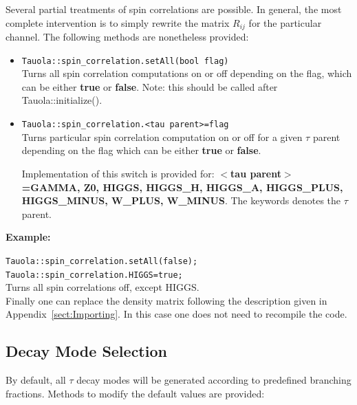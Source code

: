 \documentclass[]{Tauola_interface_design}
\begin{document}
Several partial treatments of spin correlations
are possible. In general, the most complete   intervention is to simply rewrite the matrix $R_{ij}$ 
for the particular channel. The following methods are nonetheless provided:

\begin{itemize}
 \item {\tt Tauola::spin\_correlation.setAll(bool flag)} \hfill \\
Turns all spin correlation computations on or off depending on the flag, which can be either \textbf{true} or \textbf{false}.
Note: this should be called after Tauola::initialize().
 \item {\tt Tauola::spin\_correlation.<tau parent>=flag} \hfill \\
Turns particular spin correlation computation on or off for a given $\tau$ parent depending on the flag which can be either
\textbf{true} or \textbf{false}. 


Implementation of this switch is provided for: \textbf{$<$tau parent$>$=GAMMA, Z0, HIGGS, HIGGS\_H, HIGGS\_A, 
HIGGS\_PLUS, HIGGS\_MINUS, W\_PLUS, W\_MINUS}. The keywords denotes the $\tau$ parent.

\end{itemize}

\noindent
 \textbf{Example:} 

\noindent
{\tt Tauola::spin\_correlation.setAll(false); } \\
{\tt Tauola::spin\_correlation.HIGGS=true; } \\
{Turns all spin correlations off, except HIGGS.} \hfill \\


 Finally one can replace the density matrix following the description given in Appendix~\ref{sect:Importing}.
In this case one  does not need to recompile the code.

\subsection{Decay Mode Selection}
\label{subsection:DecayModeSelection}
By default, all $\tau$ decay modes will be generated according to predefined branching fractions.  
Methods to modify the default values are provided:
\end{document}
